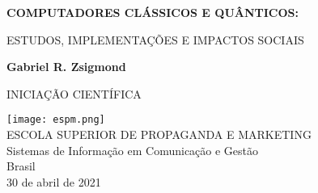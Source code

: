 \begin{titlepage}
    \begin{center}
        \vspace*{1cm}
        \LARGE
        \textbf{COMPUTADORES CLÁSSICOS E QUÂNTICOS:}
        
        \vspace{0.5cm}
        \large
        ESTUDOS, IMPLEMENTAÇÕES E IMPACTOS SOCIAIS
        
        \vspace{1.5cm}
        
        \textbf{Gabriel R. Zsigmond}
        \vfill
        
        INICIAÇÃO CIENTÍFICA
        
        \vspace{0.8cm}
        
        \texttt{[image: espm.png]}\\
        \large
        ESCOLA SUPERIOR DE PROPAGANDA E MARKETING\\
        Sistemas de Informação em Comunicação e Gestão\\
        Brasil\\
        30 de abril de 2021\\
        
    \end{center}
\end{titlepage}
